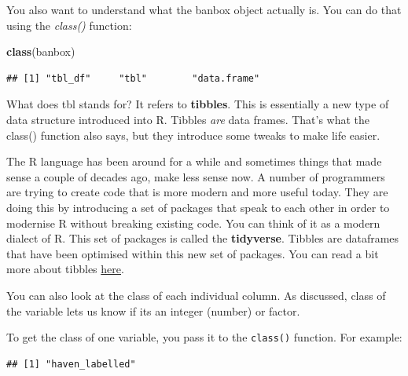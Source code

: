 \documentclass[]{book}
\newenvironment{Shaded}{\begin{snugshade}}{\end{snugshade}}
\newcommand{\KeywordTok}[1]{\textcolor[rgb]{0.13,0.29,0.53}{\textbf{#1}}}
\newcommand{\NormalTok}[1]{#1}
\newcommand{\OperatorTok}[1]{\textcolor[rgb]{0.81,0.36,0.00}{\textbf{#1}}}
\theoremstyle{definition}
\theoremstyle{definition}
\theoremstyle{definition}
\theoremstyle{remark}
\begin{document}
You also want to understand what the banbox object actually is. You can
do that using the \emph{class()} function:

\begin{Shaded}
\begin{Highlighting}[]
\KeywordTok{class}\NormalTok{(banbox)}
\end{Highlighting}
\end{Shaded}

\begin{verbatim}
## [1] "tbl_df"     "tbl"        "data.frame"
\end{verbatim}

What does tbl stands for? It refers to \textbf{tibbles}. This is
essentially a new type of data structure introduced into R. Tibbles
\emph{are} data frames. That's what the class() function also says, but
they introduce some tweaks to make life easier.

The R language has been around for a while and sometimes things that
made sense a couple of decades ago, make less sense now. A number of
programmers are trying to create code that is more modern and more
useful today. They are doing this by introducing a set of packages that
speak to each other in order to modernise R without breaking existing
code. You can think of it as a modern dialect of R. This set of packages
is called the \textbf{tidyverse}. Tibbles are dataframes that have been
optimised within this new set of packages. You can read a bit more about
tibbles \href{http://r4ds.had.co.nz/tibbles.html}{here}.

You can also look at the class of each individual column. As discussed,
class of the variable lets us know if its an integer (number) or factor.

To get the class of one variable, you pass it to the \texttt{class()}
function. For example:

\begin{Shaded}
\end{Shaded}

\begin{verbatim}
## [1] "haven_labelled"
\end{verbatim}

\begin{Shaded}
\end{Shaded}
\end{document}
